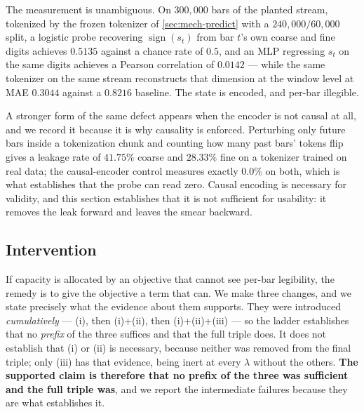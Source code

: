 The measurement is unambiguous. On $300{,}000$ bars of the planted stream, tokenized by the frozen
tokenizer of \cref{sec:mech-predict} with a $240{,}000/60{,}000$ split, a logistic probe recovering
$\operatorname{sign}(s_t)$ from bar $t$'s own coarse and fine digits achieves $0.5135$ against a
chance rate of $0.5$, and an MLP regressing $s_t$ on the same digits achieves a Pearson correlation
of $0.0142$ --- while the same tokenizer on the same stream reconstructs that dimension at the
window level at MAE $0.3044$ against a $0.8216$ baseline. The state is encoded, and per-bar
illegible.

A stronger form of the same defect appears when the encoder is not causal at all, and we record it
because it is why causality is enforced. Perturbing only future bars inside a tokenization chunk
and counting how many past bars' tokens flip gives a leakage rate of $41.75\%$ coarse and $28.33\%$
fine on a tokenizer trained on real data; the causal-encoder control measures exactly $0.0\%$ on
both, which is what establishes that the probe can read zero.
Causal encoding is necessary for validity, and this section establishes that it is not sufficient
for usability: it removes the leak forward and leaves the smear backward.

\subsection{Intervention}
\label{sec:mech-fix}

If capacity is allocated by an objective that cannot see per-bar legibility, the remedy is to give
the objective a term that can. We make three changes, and we state precisely what the evidence
about them supports. They were introduced \emph{cumulatively} --- (i), then (i)+(ii), then
(i)+(ii)+(iii) --- so the ladder establishes that no \emph{prefix} of the three suffices and that
the full triple does. It does not establish that (i) or (ii) is necessary, because neither was
removed from the final triple; only (iii) has that evidence, being inert at every $\lambda$ without
the others. \textbf{The supported claim is therefore that no prefix of the three was sufficient
and the full triple was}, and we report the intermediate failures because they are what establishes
it.

